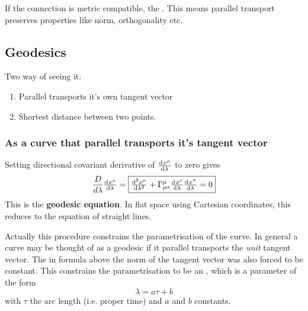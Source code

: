 

If the connection is metric compatible, the . This means parallel transport preserves properties like norm, orthogonality etc.

\subsection{Geodesics}
Two way of seeing it:
\begin{enumerate}
\item Parallel transports it's own tangent vector
\item Shortest distance between two points.
\end{enumerate}

\subsubsection{As a curve that parallel transports it's tangent vector}
Setting directional covariant derivative of $\od{x^\mu}{\lambda}$ to zero gives
\[ \frac{D}{d\lambda}\od{x^\mu}{\lambda} = \boxed{ \od[2]{x^\mu}{\lambda} + \Gamma^\mu_{\rho\sigma}\od{x^\rho}{\lambda}\od{x^\sigma}{\lambda} = 0 } \]
This is the \textbf{geodesic equation}. In flat space using Cartesian coordinates, this reduces to the equation of straight lines.

Actually this procedure constrains the parametrisation of the curve. In general a curve may be thought of as a geodesic if it parallel transports the \emph{unit} tangent vector. The in formula above the norm of the tangent vector was also forced to be constant. This constrains the parametrisation to be an , which is a parameter of the form
\[ \lambda = a\tau + b \]
with $\tau$ the arc length (i.e. proper time) and $a$ and $b$ constants.

